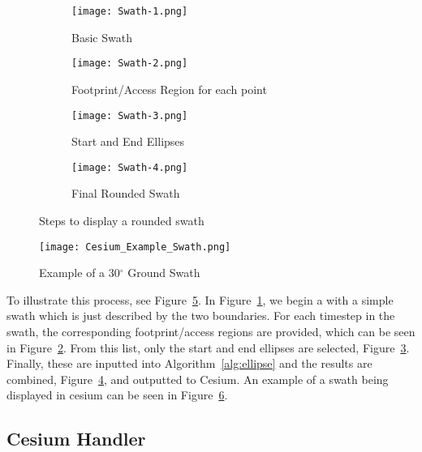 \begin{description}
\begin{figure}
    \centering
    \begin{subfigure}[b]{0.45\textwidth}
	\texttt{[image: Swath-1.png]} 
	\caption{Basic Swath}
	\label{fig:swath-1}
    \end{subfigure}
    \hfill
    \begin{subfigure}[b]{0.45\textwidth}
	\texttt{[image: Swath-2.png]} 
	\caption{Footprint/Access Region for each point}
	\label{fig:swath-2}
    \end{subfigure}
    \begin{subfigure}[b]{0.45\textwidth}
	\texttt{[image: Swath-3.png]} 
	\caption{Start and End Ellipses}
	\label{fig:swath-3}
    \end{subfigure}
    \hfill
    \begin{subfigure}[b]{0.45\textwidth}
	\texttt{[image: Swath-4.png]} 
	\caption{Final Rounded Swath}
	\label{fig:swath-4}
    \end{subfigure}

    \caption{Steps to display a rounded swath}
    \label{fig:swath-steps}
\end{figure}


\begin{figure}
    \centering
    \texttt{[image: Cesium\_Example\_Swath.png]} 
    \caption{Example of a 30$^\circ$ Ground Swath}
    \label{fig:cesium_swath}
\end{figure} 

To illustrate this process, see Figure~\ref{fig:swath-steps}.  In
Figure~\ref{fig:swath-1}, we begin a with a simple swath which is just
described by the two boundaries. For each timestep in the swath, the
corresponding footprint/access regions are provided, which can be seen in
Figure~\ref{fig:swath-2}.  From this list, only the start and end ellipses are
selected, Figure~\ref{fig:swath-3}. Finally, these are inputted into
Algorithm~\ref{alg:ellipse} and the results are combined,
Figure~\ref{fig:swath-4}, and outputted to Cesium. An example of a swath being
displayed in cesium can be seen in Figure~\ref{fig:cesium_swath}. 

\end{description}


\subsection{Cesium Handler}


